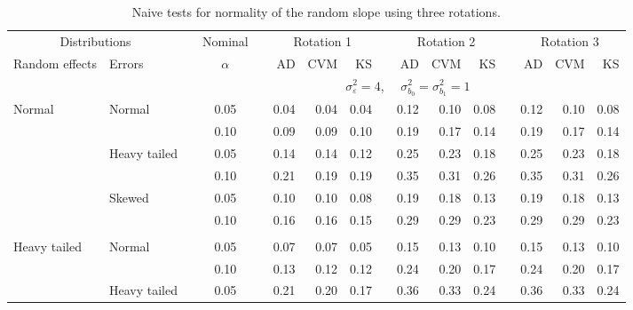 \documentclass{article} %
\begin{document}
\begin{table}[ht]
\begin{scriptsize}
\begin{center}
\begin{tabular}{ll p{.1cm} c p{.1cm} rrr p{.1cm} rrr p{.1cm} rrr}
   \hline
\end{tabular}
\end{center}
\end{scriptsize}
\end{table}



\begin{table}[ht]
\caption{Naive tests for normality of the random slope using three rotations.}
\begin{scriptsize}
\begin{center}
\begin{tabular}{ll p{.1cm} c p{.1cm} rrr p{.1cm} rrr p{.1cm} rrr}
  \hline
  \multicolumn{2}{c}{Distributions}& & Nominal & &  \multicolumn{3}{c}{Rotation 1} & & \multicolumn{3}{c}{Rotation 2} & & \multicolumn{3}{c}{Rotation 3}\\ \cline{1-2} \cline{6-8} \cline{10-12} \cline{14-16}
  Random effects & Errors & & $\alpha$ & & AD & CVM & KS & & AD & CVM & KS & & AD & CVM & KS \\ 
   \hline
& && && \multicolumn{9}{c}{$\sigma_{\varepsilon}^2 = 4$, \ \ $\sigma_{b_0}^2 = \sigma_{b_1}^2 = 1$} \\ \cline{6-16}
Normal       & Normal       && 0.05 &&   0.04 & 0.04 & 0.04 && 0.12 & 0.10 & 0.08 && 0.12 & 0.10 & 0.08 \\ 
             &              && 0.10 &&   0.09 & 0.09 & 0.10 && 0.19 & 0.17 & 0.14 && 0.19 & 0.17 & 0.14 \\ 
             & Heavy tailed && 0.05 &&   0.14 & 0.14 & 0.12 && 0.25 & 0.23 & 0.18 && 0.25 & 0.23 & 0.18 \\ 
             &              && 0.10 &&   0.21 & 0.19 & 0.19 && 0.35 & 0.31 & 0.26 && 0.35 & 0.31 & 0.26 \\ 
             & Skewed       && 0.05 &&   0.10 & 0.10 & 0.08 && 0.19 & 0.18 & 0.13 && 0.19 & 0.18 & 0.13 \\ 
             &              && 0.10 &&   0.16 & 0.16 & 0.15 && 0.29 & 0.29 & 0.23 && 0.29 & 0.29 & 0.23 \\ 
             &&&&&&&&&&&&&&&\\
Heavy tailed & Normal       && 0.05 &&   0.07 & 0.07 & 0.05 && 0.15 & 0.13 & 0.10 && 0.15 & 0.13 & 0.10 \\ 
             &              && 0.10 &&   0.13 & 0.12 & 0.12 && 0.24 & 0.20 & 0.17 && 0.24 & 0.20 & 0.17 \\ 
             & Heavy tailed && 0.05 &&   0.21 & 0.20 & 0.17 && 0.36 & 0.33 & 0.24 && 0.36 & 0.33 & 0.24 \\ 

\end{tabular}
\end{center}
\end{scriptsize}
\end{table}
\end{document}
